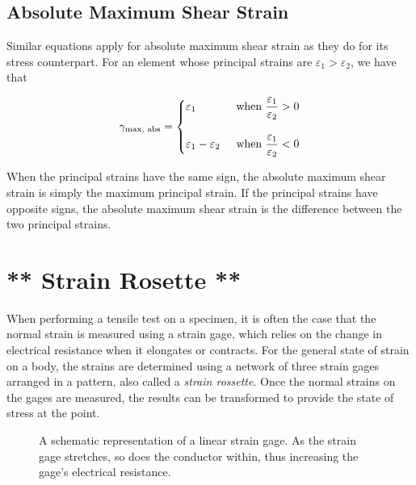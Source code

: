 \documentclass[
10pt,
a4paper,
openany,
svgnames,
]{kaobook} %
\begin{document}
\subsection{Absolute Maximum Shear Strain}

Similar equations apply for absolute maximum shear strain as they do for its stress counterpart. For an element whose principal strains are $\varepsilon_1 > \varepsilon_2$, we have that

\begin{equation}
  \gamma_{\text{max, abs}} = \left\{
    \begin{gathered}
      \varepsilon_1 \hfill \text{when } \frac{\varepsilon_1}{\varepsilon_2} > 0 \\[10pt]
      \varepsilon_1 - \varepsilon_2 \hspace{0.5cm} \text{when } \frac{\varepsilon_1}{\varepsilon_2} < 0
    \end{gathered} \right.
\end{equation}

When the principal strains have the same sign, the absolute maximum shear strain is simply the maximum principal strain. If the principal strains have opposite signs, the absolute maximum shear strain is the difference between the two principal strains.

\section{** Strain Rosette **}

When performing a tensile test on a specimen, it is often the case that the normal strain is measured using a strain gage, which relies on the change in electrical resistance when it elongates or contracts. For the general state of strain on a body, the strains are determined using a network of three strain gages arranged in a pattern, also called a \emph{strain rossette}. Once the normal strains on the gages are measured, the results can be transformed to provide the state of stress at the point.

\begin{figure}[h]
  \centering
  \caption{A schematic representation of a linear strain gage. As the strain gage stretches, so does the conductor within, thus increasing the gage's electrical resistance.}
\end{figure}
\end{document}
